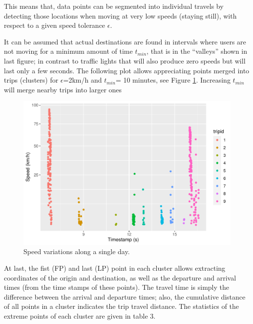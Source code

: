 \documentclass[]{elsarticle} %
\begin{document}
This means that, data points can be segmented into individual travels by
detecting those locations when moving at very low speeds (staying
still), with respect to a given speed tolerance \(\epsilon\).

It can be assumed that actual destinations are found in intervals where
users are not moving for a minimum amount of time \(t_{min}\), that is
in the ``valleys'' shown in last figure; in contrast to traffic lights
that will also produce zero speeds but will last only a few seconds. The
following plot allows appreciating points merged into trips (clusters)
for \(\epsilon\)=2km/h and \(t_{min}\)= 10 minutes, see Figure
\ref{fig5}. Increasing \(t_{min}\) will merge nearby trips into larger
ones

\begin{figure}
\centering
\includegraphics{Elsevier_files/figure-latex/speed-hour2-plot-1.pdf}
\caption{\label{fig5}Speed variations along a single day.}
\end{figure}

At last, the fist (FP) and last (LP) point in each cluster allows
extracting coordinates of the origin and destination, as well as the
departure and arrival times (from the time stamps of these points). The
travel time is simply the difference between the arrival and departure
times; also, the cumulative distance of all points in a cluster
indicates the trip travel distance. The statistics of the extreme points
of each cluster are given in table 3.
\end{document}

